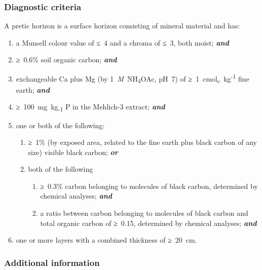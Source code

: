 \documentclass[
  letterpaper,
  DIV=11,
  numbers=noendperiod]{scrreprt}
\providecommand{\tightlist}{%
  \setlength{\itemsep}{0pt}\setlength{\parskip}{0pt}}\usepackage{longtable,booktabs,array}
\begin{document}
\hypertarget{diagnostic-criteria-30}{%
\subsubsection{Diagnostic criteria}\label{diagnostic-criteria-30}}

A pretic horizon is a surface horizon consisting of mineral material and
has:

\begin{enumerate}
\def\labelenumi{\arabic{enumi}.}
\tightlist
\item
  a Munsell colour value of ≤~4 and a chroma of ≤~3, both moist;
  \textbf{\emph{and}}
\item
  ≥~0.6\% soil organic carbon; \textbf{\emph{and}}
\item
  exchangeable Ca plus Mg (by 1~\emph{M}~NH\textsubscript{4}OAc, pH~7)
  of ≥~1~cmol\textsubscript{c}~kg\textsuperscript{-1} fine earth;
  \textbf{\emph{and}}
\item
  ≥~100~mg~kg\textsubscript{-1} P in the Mehlich-3 extract;
  \textbf{\emph{and}}
\item
  one or both of the following:

  \begin{enumerate}
  \def\labelenumii{\alph{enumii}.}
  \tightlist
  \item
    ≥~1\% (by exposed area, related to the fine earth plus black carbon
    of any size) visible black carbon; \textbf{\emph{or}}
  \item
    both of the following

    \begin{enumerate}
    \def\labelenumiii{\roman{enumiii}.}
    \tightlist
    \item
      ≥~0.3\% carbon belonging to molecules of black carbon, determined
      by chemical analyses; \textbf{\emph{and}}
    \item
      a ratio between carbon belonging to molecules of black carbon and
      total organic carbon of ≥~0.15, determined by chemical analyses;
      \textbf{\emph{and}}
    \end{enumerate}
  \end{enumerate}
\item
  one or more layers with a combined thickness of ≥~20~cm.
\end{enumerate}

\hypertarget{additional-information-17}{%
\subsubsection{Additional information}\label{additional-information-17}}
\end{document}

